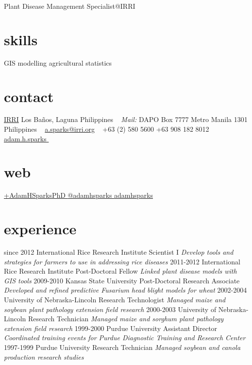 
       {Plant Disease Management Specialist@IRRI}


\begin{aside}
\section{skills}
\small{GIS
modelling
agricultural statistics
~
\section{contact}
\href{http://www.irri.org/}{IRRI}
Los Ba\~nos, Laguna
Philippines
~
\emph{Mail:}
DAPO Box 7777
Metro Manila
1301 Philippines
~
\href{mailto:a.sparks@irri.org}{a.sparks@irri.org}
~
+63 (2) 580 5600 \faPhone
+63 908 182 8012  \faMobilePhone
{\href{skype:adam.h.sparks?call}{adam.h.sparks }}
~
\section{web}
\href{http://plus.google.com/+AdamHSparksPhD}{+AdamHSparksPhD {\color{google.plus}\faGooglePlusSign}}
\href{https://www.twitter.com/adamhsparks/}{@adamhsparks {\color{twitter.blue}\faTwitter}}
\href{https://github.com/adamhsparks/}{adamhsparks \faGithub}}
\end{aside}

\section{experience}
\begin{entrylist}
  \entry
    {since 2012}
    {International Rice Research Institute }
    {Scientist I}
    {\emph{Develop tools and strategies for farmers to use in addressing rice diseases}}
  \entry
    {2011-2012}
    {International Rice Research Institute }
    {Post-Doctoral Fellow}
    {\emph{Linked plant disease models with GIS tools}}
  \entry
    {2009-2010}
    {Kansas State University}
    {Post-Doctoral Research Associate}
    {\emph{Developed and refined predictive Fusarium head blight models for wheat}}
  \entry
   {2002-2004}
   {University of Nebraska-Lincoln}
   {Research Technologist}
   {\emph{Managed maize and soybean plant pathology extension field research}}
  \entry
   {2000-2003}
   {University of Nebraska-Lincoln}
   {Research Technician}
   {\emph{Managed maize and sorghum plant pathology extension field research}}
  \entry
   {1999-2000}
   {Purdue University}
   {Assistant Director}
   {\emph{Coordinated training events for Purdue Diagnostic Training and Research Center}}
  \entry
   {1997-1999}
   {Purdue University}
   {Research Technician}
   {\emph{Managed soybean and canola production research studies}}
\end{entrylist}

